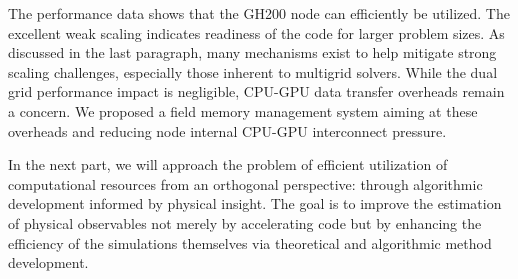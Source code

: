 The performance data shows that the GH200 node can efficiently be utilized.
The excellent weak scaling indicates readiness of the code for larger problem sizes.
As discussed in the last paragraph, many mechanisms exist to help mitigate strong scaling challenges, especially those inherent to multigrid solvers.
While the dual grid performance impact is negligible, CPU-GPU data transfer overheads remain a concern.
We proposed a field memory management system aiming at these overheads and reducing node internal CPU-GPU interconnect pressure.

In the next part, we will approach the problem of efficient utilization of computational resources from an orthogonal perspective: through algorithmic development informed by physical insight.
The goal is to improve the estimation of physical observables not merely by accelerating code but by enhancing the efficiency of the simulations themselves via theoretical and algorithmic method development.


